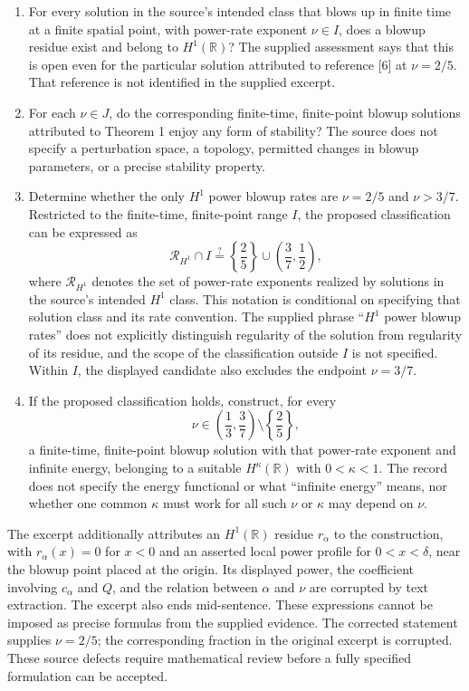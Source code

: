 \documentclass[11pt]{article}
\newcommand{\R}{\mathbb{R}}
\begin{document}
\begin{enumerate}
\item For every solution in the source's intended class that blows up in finite time at a finite spatial point, with power-rate exponent \(\nu\in I\), does a blowup residue exist and belong to \(H^1(\R)\)? The supplied assessment says that this is open even for the particular solution attributed to reference [6] at \(\nu=2/5\). That reference is not identified in the supplied excerpt.
\item For each \(\nu\in J\), do the corresponding finite-time, finite-point blowup solutions attributed to Theorem 1 enjoy any form of stability? The source does not specify a perturbation space, a topology, permitted changes in blowup parameters, or a precise stability property.
\item Determine whether the only \(H^1\) power blowup rates are \(\nu=2/5\) and \(\nu>3/7\). Restricted to the finite-time, finite-point range \(I\), the proposed classification can be expressed as
\[
\mathcal R_{H^1}\cap I\stackrel{?}{=}\left\{\frac25\right\}\cup\left(\frac37,\frac12\right),
\]
where \(\mathcal R_{H^1}\) denotes the set of power-rate exponents realized by solutions in the source's intended \(H^1\) class. This notation is conditional on specifying that solution class and its rate convention. The supplied phrase ``\(H^1\) power blowup rates'' does not explicitly distinguish regularity of the solution from regularity of its residue, and the scope of the classification outside \(I\) is not specified. Within \(I\), the displayed candidate also excludes the endpoint \(\nu=3/7\).
\item If the proposed classification holds, construct, for every
\[
\nu\in\left(\frac13,\frac37\right)\setminus\left\{\frac25\right\},
\]
a finite-time, finite-point blowup solution with that power-rate exponent and infinite energy, belonging to a suitable \(H^\kappa(\R)\) with \(0<\kappa<1\). The record does not specify the energy functional or what ``infinite energy'' means, nor whether one common \(\kappa\) must work for all such \(\nu\) or \(\kappa\) may depend on \(\nu\).
\end{enumerate}

The excerpt additionally attributes an \(H^1(\R)\) residue \(r_\alpha\) to the construction, with \(r_\alpha(x)=0\) for \(x<0\) and an asserted local power profile for \(0<x<\delta\), near the blowup point placed at the origin. Its displayed power, the coefficient involving \(c_\alpha\) and \(Q\), and the relation between \(\alpha\) and \(\nu\) are corrupted by text extraction. The excerpt also ends mid-sentence. These expressions cannot be imposed as precise formulas from the supplied evidence. The corrected statement supplies \(\nu=2/5\); the corresponding fraction in the original excerpt is corrupted. These source defects require mathematical review before a fully specified formulation can be accepted.
\end{document}
